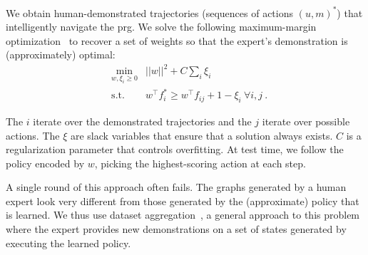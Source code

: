 We obtain human-demonstrated trajectories (sequences of actions $(u,
m)^{*}$) that intelligently navigate the {\sc prg}. We solve the
following maximum-margin optimization~\cite{taskar2005learning} to
recover a set of weights so that the expert's demonstration is
(approximately) optimal:
\begin{align*}
&\min_{w, \xi_i \geq 0} & ||w||^2 + C \sum_i \xi_i\\
&\text{s.t.} & w^{\top}f^*_i \geq w^{\top}f_{ij} + 1 - \xi_{i}\ \forall i, j \ .
\end{align*}

The $i$ iterate over the demonstrated trajectories and the $j$ iterate
over possible actions. The $\xi$ are slack variables that ensure that
a solution always exists. $C$ is a regularization parameter that
controls overfitting. At test time, we follow the policy encoded by
$w$, picking the highest-scoring action at each step.

A single round of this approach often fails. The graphs generated by a
human expert look very different from those generated by
the (approximate) policy that is learned. We thus use dataset
aggregation~\cite{dagger}, a general approach to this problem where
the expert provides new demonstrations on a set of states generated by
executing the learned policy.

